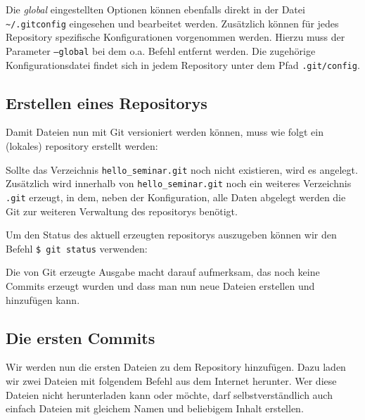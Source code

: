 Die \textit{global} eingestellten Optionen können ebenfalls direkt in der Datei
\texttt{\textasciitilde/.gitconfig} eingesehen und bearbeitet werden.
Zusätzlich können für jedes Repository spezifische Konfigurationen vorgenommen
werden. Hierzu muss der Parameter \texttt{--global} bei dem o.a. Befehl
entfernt werden. Die zugehörige Konfigurationsdatei findet sich in jedem
Repository unter dem Pfad \texttt{.git/config}. 

\subsection{Erstellen eines Repositorys}\label{startup}
Damit Dateien nun mit Git versioniert werden können, muss wie folgt ein
(lokales) \gls{repository} erstellt werden:



Sollte das Verzeichnis \texttt{hello\_seminar.git} noch nicht existieren, wird
es angelegt. Zusätzlich wird innerhalb von \texttt{hello\_seminar.git} noch ein
weiteres Verzeichnis \texttt{.git} erzeugt, in dem, neben der Konfiguration,
alle Daten abgelegt werden die Git zur weiteren Verwaltung des \glspl{repository}
benötigt.

Um den Status des aktuell erzeugten \glspl{repository} auszugeben können wir
den Befehl \texttt{\$ git status} verwenden:



Die von Git erzeugte Ausgabe macht darauf aufmerksam, das noch keine Commits
erzeugt wurden und dass man nun neue Dateien erstellen und hinzufügen kann.

\subsection{Die ersten Commits}\label{first_commits}

Wir werden nun die ersten Dateien zu dem Repository hinzufügen. Dazu laden wir
zwei Dateien mit folgendem Befehl aus dem Internet herunter. Wer diese Dateien
nicht herunterladen kann oder möchte, darf selbstverständlich auch einfach
Dateien mit gleichem Namen und beliebigem Inhalt erstellen.



